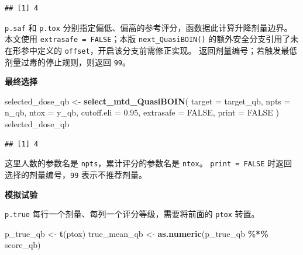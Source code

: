 \documentclass[
  chinese,
]{article}
\newenvironment{Shaded}{\begin{snugshade}}{\end{snugshade}}
\newcommand{\AttributeTok}[1]{\textcolor[rgb]{0.13,0.29,0.53}{#1}}
\newcommand{\ConstantTok}[1]{\textcolor[rgb]{0.56,0.35,0.01}{#1}}
\newcommand{\FloatTok}[1]{\textcolor[rgb]{0.00,0.00,0.81}{#1}}
\newcommand{\FunctionTok}[1]{\textcolor[rgb]{0.13,0.29,0.53}{\textbf{#1}}}
\newcommand{\NormalTok}[1]{#1}
\newcommand{\OtherTok}[1]{\textcolor[rgb]{0.56,0.35,0.01}{#1}}
\newcommand{\SpecialCharTok}[1]{\textcolor[rgb]{0.81,0.36,0.00}{\textbf{#1}}}
\begin{document}
\begin{verbatim}
## [1] 4
\end{verbatim}

\texttt{p.saf} 和 \texttt{p.tox}
分别指定偏低、偏高的参考评分，函数据此计算升降剂量边界。本文使用
\texttt{extrasafe\ =\ FALSE}；本版 \texttt{next\_QuasiBOIN()}
的额外安全分支引用了未在形参中定义的
\texttt{offset}，开启该分支前需修正实现。
返回剂量编号；若触发最低剂量过毒的停止规则，则返回 \texttt{99}。

\textbf{最终选择}

\begin{Shaded}
\begin{Highlighting}[]
\NormalTok{selected\_dose\_qb }\OtherTok{\textless{}{-}} \FunctionTok{select\_mtd\_QuasiBOIN}\NormalTok{(}
  \AttributeTok{target =}\NormalTok{ target\_qb, }\AttributeTok{npts =}\NormalTok{ n\_qb, }\AttributeTok{ntox =}\NormalTok{ y\_qb,}
  \AttributeTok{cutoff.eli =} \FloatTok{0.95}\NormalTok{, }\AttributeTok{extrasafe =} \ConstantTok{FALSE}\NormalTok{, }\AttributeTok{print =} \ConstantTok{FALSE}
\NormalTok{)}
\NormalTok{selected\_dose\_qb}
\end{Highlighting}
\end{Shaded}

\begin{verbatim}
## [1] 4
\end{verbatim}

这里人数的参数名是 \texttt{npts}，累计评分的参数名是 \texttt{ntox}。
\texttt{print\ =\ FALSE} 时返回选择的剂量编号，\texttt{99}
表示不推荐剂量。

\textbf{模拟试验}

\texttt{p.true} 每行一个剂量、每列一个评分等级，需要将前面的
\texttt{ptox} 转置。

\begin{Shaded}
\begin{Highlighting}[]
\NormalTok{p\_true\_qb }\OtherTok{\textless{}{-}} \FunctionTok{t}\NormalTok{(ptox)}
\NormalTok{true\_mean\_qb }\OtherTok{\textless{}{-}} \FunctionTok{as.numeric}\NormalTok{(p\_true\_qb }\SpecialCharTok{\%*\%}\NormalTok{ score\_qb)}
\end{Highlighting}
\end{Shaded}
\end{document}
